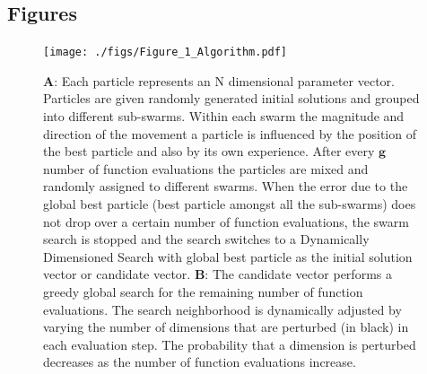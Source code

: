 \documentclass{bmcart}
\begin{document}
\begin{backmatter}




\clearpage

\section*{Figures}

\begin{figure}[h!]
\centering
\texttt{[image: ./figs/Figure\_1\_Algorithm.pdf]}
\caption{ \textbf{A}: Each particle represents an N dimensional parameter vector.
Particles are given randomly generated initial solutions and grouped into different sub-swarms. Within each swarm the magnitude and direction of the movement a particle is influenced by the position of the best particle and also by its own experience. After every $\mathbf{g}$ number of function evaluations the particles are mixed and randomly assigned to different swarms. When the error due to the global best particle (best particle amongst all the sub-swarms) does not drop over a certain number of function evaluations, the swarm search is stopped and the search switches to a Dynamically Dimensioned Search with global best particle as the initial solution vector or candidate vector.
\textbf{B}: The candidate vector performs a greedy global search for the remaining number of function evaluations. The search neighborhood is dynamically adjusted by varying the number of dimensions that are perturbed (in black) in each evaluation step.
The probability that a dimension is perturbed decreases as the number of function evaluations increase.
}\label{fig-algorithm}
\end{figure}


\end{backmatter}
\end{document}
